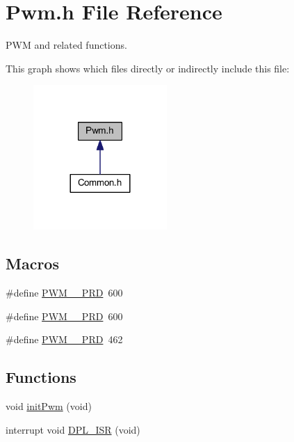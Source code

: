 \hypertarget{a00038}{\section{Pwm.\-h File Reference}
\label{a00038}
}


P\-W\-M and related functions.  


This graph shows which files directly or indirectly include this file\-:\nopagebreak
\begin{figure}[H]
\begin{center}
\leavevmode
\includegraphics[width=144pt]{a00071}
\end{center}
\end{figure}
\subsection*{Macros}
\begin{DoxyCompactItemize}
\item 
\#define \hyperlink{a00038_a4d7cfbafe2831b32ac69043fe2a51d1f}{P\-W\-M\-\_\-\_\-\-P\-R\-D}~600
\item 
\#define \hyperlink{a00038_a446b4ce74c284aad70100e3f7fecffa0}{P\-W\-M\-\_\-\_\-\-P\-R\-D}~600
\item 
\#define \hyperlink{a00038_a11feddb81d3d7f2f6e001b77685a1f60}{P\-W\-M\-\_\-\_\-\-P\-R\-D}~462
\end{DoxyCompactItemize}
\subsection*{Functions}
\begin{DoxyCompactItemize}
\item 
void \hyperlink{a00038_a13138c31d3576e8a8858b964882cfc69}{init\-Pwm} (void)
\item 
interrupt void \hyperlink{a00038_a5532a53363218854b0e4b15049d773f7}{D\-P\-L\-\_\-\-I\-S\-R} (void)
\end{DoxyCompactItemize}
